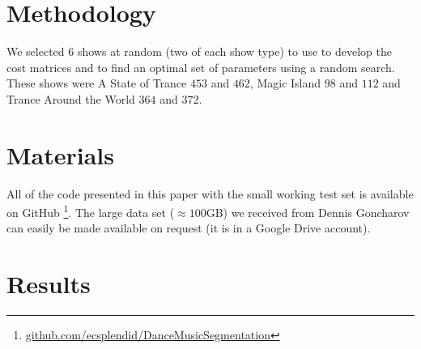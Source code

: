 \documentclass[twocolumn]{article}
\begin{document}
\section{Methodology}

We selected $6$ shows at random (two of each show type) to use to develop the cost matrices and to find an optimal set of parameters using a random search. These shows were A State of Trance $453$ and $462$, Magic Island $98$ and $112$ and Trance Around the World $364$ and $372$.



\section{Materials}\label{sec:materials}

All of the code presented in this paper with the small working test set is available on GitHub \footnote{\url{github.com/ecsplendid/DanceMusicSegmentation}}. The large data set ($\approx100$GB) we received from Dennis Goncharov can easily be made available on request (it is in a Google Drive account).

\section{Results}
\end{document}
